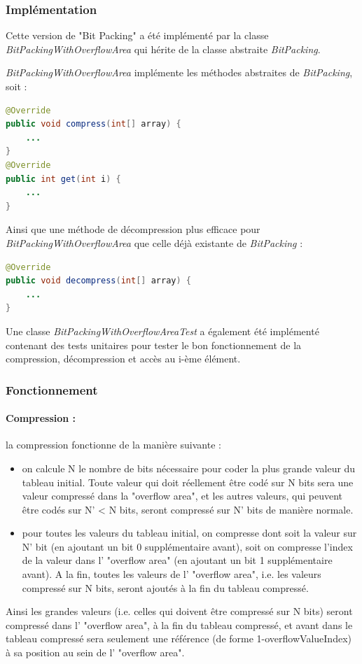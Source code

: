 \documentclass[titlepage]{article}
\begin{document}
\subsubsection{Implémentation}

Cette version de "Bit Packing" a été implémenté par la classe \textsl{BitPackingWithOverflowArea} qui hérite de la classe abstraite \textsl{BitPacking}.
\par \textsl{BitPackingWithOverflowArea} implémente les méthodes abstraites de \textsl{BitPacking}, soit :
\begin{lstlisting}[language=Java]
@Override
public void compress(int[] array) {
	...
}
@Override
public int get(int i) {
	...
}
\end{lstlisting}
Ainsi que une méthode de décompression plus efficace pour \textsl{BitPackingWithOverflowArea} que celle déjà existante de \textsl{BitPacking} :
\begin{lstlisting}[language=Java]
@Override
public void decompress(int[] array) {
	...
}
\end{lstlisting}

\par Une classe \textsl{BitPackingWithOverflowAreaTest} a également été implémenté contenant des tests unitaires pour tester le bon fonctionnement de la compression, décompression et accès au i-ème élément.


\subsubsection{Fonctionnement}

\paragraph{Compression :} la compression fonctionne de la manière suivante :
\begin{itemize}
\item on calcule N le nombre de bits nécessaire pour coder la plus grande valeur du tableau initial. Toute valeur qui doit réellement être codé sur N bits sera une valeur compressé dans la "overflow area", et les autres valeurs, qui peuvent être codés sur N' < N bits, seront compressé sur N' bits de manière normale.
\item pour toutes les valeurs du tableau initial, on compresse dont soit la valeur sur N' bit (en ajoutant un bit 0 supplémentaire avant), soit on compresse l'index de la valeur dans l' "overflow area" (en ajoutant un bit 1 supplémentaire avant). A la fin, toutes les valeurs de l' "overflow area", i.e. les valeurs compressé sur N bits, seront ajoutés à la fin du tableau compressé.
\end{itemize}
\par Ainsi les grandes valeurs (i.e. celles qui doivent être compressé sur N bits) seront compressé dans l' "overflow area", à la fin du tableau compressé, et avant dans le tableau compressé sera seulement une référence (de forme 1-overflowValueIndex) à sa position au sein de l' "overflow area".
\end{document}
